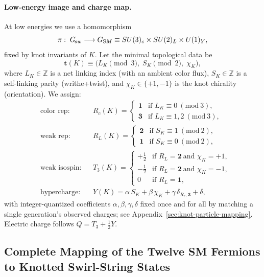 \documentclass[11pt, preprint,titlepage]{revtex4-2}
\begin{document}
	\paragraph{Low-energy image and charge map.}
	At low energies we use a homomorphism
	\[
		\pi:\; G_{\!sw}\longrightarrow G_{\textrm SM}\equiv SU(3)_c\times SU(2)_L\times U(1)_Y,
	\]
	fixed by knot invariants of \(K\).
	Let the minimal topological data be
	\[
		\mathbf{t}(K)\equiv\big(L_K\!\!\!\!\pmod{3},\; S_K\!\!\!\!\pmod{2},\; \chi_K\big),
	\]
	where \(L_K\in\mathbb{Z}\) is a net linking index (with an ambient color flux), \(S_K\in\mathbb{Z}\) is a self-linking parity (writhe+twist), and \(\chi_K\in\{+1,-1\}\) is the knot chirality (orientation).
	We assign:
	\begin{align}
		&\text{color rep:} &&
		R_c(K)=
		\begin{cases}
			\mathbf{1} & \text{if } L_K\equiv 0\ (\mathrm{mod}\ 3),\\
			\mathbf{3} & \text{if } L_K\equiv 1,2\ (\mathrm{mod}\ 3),
		\end{cases}
		\\[2pt]
		&\text{weak rep:} &&
		R_L(K)=
		\begin{cases}
			\mathbf{2} & \text{if } S_K\equiv 1\ (\mathrm{mod}\ 2),\\
			\mathbf{1} & \text{if } S_K\equiv 0\ (\mathrm{mod}\ 2),
		\end{cases}
		\\[2pt]
		&\text{weak isospin:} &&
		T_3(K)=
		\begin{cases}
			+\tfrac{1}{2} & \text{if } R_L=\mathbf{2}\ \text{and }\chi_K=+1,\\
			-\tfrac{1}{2} & \text{if } R_L=\mathbf{2}\ \text{and }\chi_K=-1,\\
			0 & \text{if } R_L=\mathbf{1},
		\end{cases}
		\\[2pt]
		&\text{hypercharge:} &&
		Y(K)=\alpha\,S_K+\beta\,\chi_K+\gamma\,\delta_{R_c,\mathbf{3}}+\delta,
		\label{eq:Y-map}
	\end{align}
	with integer-quantized coefficients \(\alpha,\beta,\gamma, \delta\) fixed once and for all by matching a single generation’s observed charges; see Appendix~\ref{sec:knot-particle-mapping}.
	Electric charge follows \(Q=T_3+\tfrac12 Y\).


\subsection*{Complete Mapping of the Twelve SM Fermions to Knotted Swirl-String States}
\end{document}
